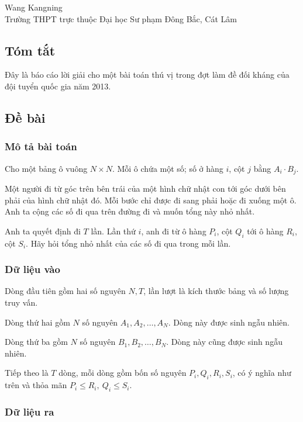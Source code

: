 \documentclass[11pt]{article}
\begin{document}
\begin{center}
Wang Kangning\\
Trường THPT trực thuộc Đại học Sư phạm Đông Bắc, Cát Lâm
\end{center}

\subsection*{Tóm tắt}

Đây là báo cáo lời giải cho một bài toán thú vị trong đợt làm đề đối kháng
của đội tuyển quốc gia năm 2013.

\subsection{Đề bài}

\subsubsection{Mô tả bài toán}

Cho một bảng ô vuông \(N\times N\). Mỗi ô chứa một số; số ở hàng \(i\), cột
\(j\) bằng \(A_i\cdot B_j\).

Một người đi từ góc trên bên trái của một hình chữ nhật con tới góc dưới bên
phải của hình chữ nhật đó. Mỗi bước chỉ được đi sang phải hoặc đi xuống một
ô. Anh ta cộng các số đi qua trên đường đi và muốn tổng này nhỏ nhất.

Anh ta quyết định đi \(T\) lần. Lần thứ \(i\), anh đi từ ô hàng \(P_i\), cột
\(Q_i\) tới ô hàng \(R_i\), cột \(S_i\). Hãy hỏi tổng nhỏ nhất của các số đi
qua trong mỗi lần.

\subsubsection{Dữ liệu vào}

Dòng đầu tiên gồm hai số nguyên \(N,T\), lần lượt là kích thước bảng và số
lượng truy vấn.

Dòng thứ hai gồm \(N\) số nguyên \(A_1,A_2,\ldots,A_N\). Dòng này được sinh
ngẫu nhiên.

Dòng thứ ba gồm \(N\) số nguyên \(B_1,B_2,\ldots,B_N\). Dòng này cũng được
sinh ngẫu nhiên.

Tiếp theo là \(T\) dòng, mỗi dòng gồm bốn số nguyên
\(P_i,Q_i,R_i,S_i\), có ý nghĩa như trên và thỏa mãn
\(P_i\le R_i,\ Q_i\le S_i\).

\subsubsection{Dữ liệu ra}
\end{document}
